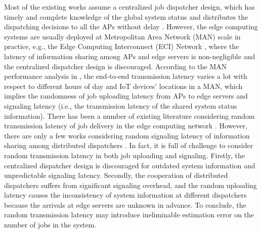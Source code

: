 Most of the existing works assume a centralized job dispatcher design, which has timely and complete knowledge of the global system status and distributes the dispatching decisions to all the APs without delay \cite{tan-online,IOTJ18-FanQ,mdp-globecom,mdp-tvt,MASS18-MengZ}.
However, the edge computing systems are usually deployed at Metropolitan Area Network (MAN) scale in practice, e.g., the Edge Computing Interconnect (ECI) Network \cite{MAN-ECI}, where the latency of information sharing among APs and edge servers is non-negligible and the centralized dispatcher design is discouraged.
According to the MAN performance analysis in \cite{MAN-LATENCY}, the end-to-end transmission latency varies a lot with respect to different hours of day and IoT devices' locations in a MAN, which implies the randomness of job uploading latency from APs to edge servers and signaling latency (i.e., the transmission latency of the shared {system status} information).
There has been a number of existing literature considering random transmission latency of job delivery in the edge computing network \cite{latency-EDGE19,MOBIHOC19-ZhouZ,IOTJ18-FanQ,TOC19-LiuC,JSAC19-AlameddineHA}.
However, there are only a few works considering random signaling latency of information sharing among distributed dispatchers \cite{tan-online,TWC18-LyuX}.
In fact, it is full of challenge to consider random transmission latency in both job uploading and signaling.
Firstly, the centralized dispatcher design is discouraged for outdated system information and unpredictable signaling latency.
Secondly, the cooperation of distributed dispatchers suffers from significant signaling overhead, and the random uploading latency causes the inconsistency of system information at different dispatchers because the arrivals at edge servers are unknown in advance.
To conclude, the random transmission latency may introduce ineliminable estimation error on the number of jobs in the system.



